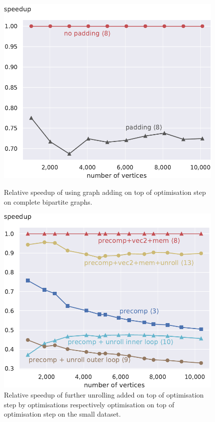 \documentclass[draft,letterpaper]{article}
\begin{document}
\begin{figure}[!t]
\begin{minipage}[t]{\oldlinewidth}\centering
	\includegraphics[width=\linewidth]{img/speedup[8]padding_bipartite.pdf}
	\caption{Relative speedup of using graph adding on top of optimisation step  on complete bipartite graphs. \label{speedupGraphPaddingBipartite}}
\end{minipage}%
\hspace{7.2mm}
\begin{minipage}[t]{\oldlinewidth}\centering
	\includegraphics[width=\linewidth]{img/speedup[3][8][9][10][13]_small.pdf}
	\caption{Relative speedup of further unrolling added on top of optimisation step  by optimisations  respectively optimisation  on top of optimisation step  on the small dataset. \label{speedupUnsuccessful}}
\end{minipage}%
\end{figure}
\end{document}
